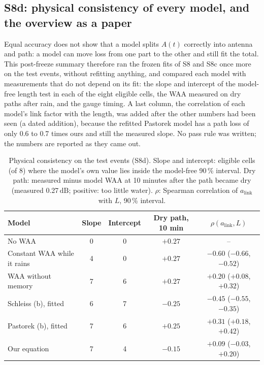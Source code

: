 \documentclass[11pt,a4paper]{article}
\newcommand{\dB}{\,\mathrm{dB}}
\begin{document}
\subsection{S8d: physical consistency of every model, and the overview as a paper}
\label{sec:s8d}

Equal accuracy does not show that a model splits $A(t)$ correctly into antenna and path: a model can move loss from one
part to the other and still fit the total. This post-freeze summary therefore ran the frozen fits of S8 and S8c once more
on the test events, without refitting anything, and compared each model with measurements that do not depend on its fit:
the slope and intercept of the model-free length test in each of the eight eligible cells, the WAA measured on dry paths
after rain, and the gauge timing. A last column, the correlation of each model's link factor with the length, was added
after the other numbers had been seen (a dated addition), because the refitted Pastorek model has a path loss of only 0.6
to 0.7 times ours and still the measured slope. No pass rule was written; the numbers are reported as they came out.

\begin{table}[H]
\centering
\caption{Physical consistency on the test events (S8d). Slope and intercept: eligible cells (of 8) where the model's own
value lies inside the model-free 90\,\% interval. Dry path: measured minus model WAA at 10 minutes after the path became
dry (measured 0.27$\dB$; positive: too little water). $\rho$: Spearman correlation of $a_{\mathrm{link}}$ with $L$, 90\,\%
interval.}
\label{tab:s8d}
\small
\begin{tabularx}{\linewidth}{@{}Y c c c c@{}}
\toprule
\textbf{Model} & \textbf{Slope} & \textbf{Intercept} & \textbf{Dry path, 10 min} & \textbf{$\rho(a_{\mathrm{link}}, L)$} \\
\midrule
No WAA & 0 & 0 & $+0.27$ & -- \\
Constant WAA while it rains & 4 & 0 & $+0.27$ & $-0.60$ ($-0.66$, $-0.52$) \\
WAA without memory & 7 & 6 & $+0.27$ & $+0.20$ ($+0.08$, $+0.32$) \\
Schleiss (b), fitted & 6 & 7 & $-0.25$ & $-0.45$ ($-0.55$, $-0.35$) \\
Pastorek (b), fitted & 7 & 6 & $+0.25$ & $+0.31$ ($+0.18$, $+0.42$) \\
Our equation & 7 & 4 & $-0.15$ & $+0.09$ ($-0.03$, $+0.20$) \\
\bottomrule
\end{tabularx}
\end{table}
\end{document}
